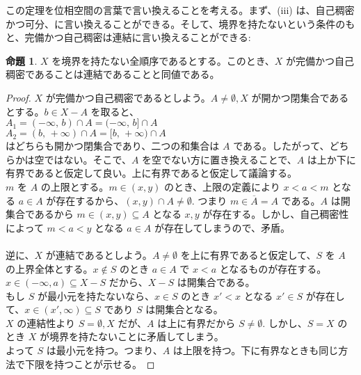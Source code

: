 \documentclass{jsarticle}
\theoremstyle{definition}
\newtheorem{proposition}[theorem]{命題}
\begin{document}
    \vspace{1.0ex}
    
    この定理を位相空間の言葉で言い換えることを考える。まず、(iii) は、自己稠密かつ可分、に言い換えることができる。そして、境界を持たないという条件のもと、完備かつ自己稠密は連結に言い換えることができる:
    
    \vspace{1.0ex}
    
    \begin{proposition}
        $X$ を境界を持たない全順序であるとする。このとき、$X$ が完備かつ自己稠密であることは連結であることと同値である。
    \end{proposition}
    \begin{proof}
        $X$ が完備かつ自己稠密であるとしよう。$A \neq \emptyset, X$ が開かつ閉集合であるとする。$b \in X - A$ を取ると、\\
        $A_1 = (-\infty, \, b) \cap A = (-\infty, \, b] \cap A$\\
        $A_2 = (b, \, +\infty) \cap A = [b, \, +\infty) \cap A$\\
        はどちらも開かつ閉集合であり、二つの和集合は $A$ である。したがって、どちらかは空ではない。そこで、$A$ を空でない方に置き換えることで、$A$ は上か下に有界であると仮定して良い。上に有界であると仮定して議論する。\\
        $m$ を $A$ の上限とする。$m \in (x, y)$ のとき、上限の定義により $x < a < m$ となる $a \in A$ が存在するから、$(x, y) \cap A \neq \emptyset.$ つまり $m \in \overline{A} = A$ である。$A$ は開集合であるから $m \in (x, y) \subseteq A$ となる $x, y$ が存在する。しかし、自己稠密性によって $m < a < y$ となる $a \in A$ が存在してしまうので、矛盾。\\
        \ \\
        逆に、$X$ が連結であるとしよう。$A\neq\emptyset$ を上に有界であると仮定して、$S$ を $A$ の上界全体とする。$x \not\in S$ のとき $a \in A$ で $x < a$ となるものが存在する。$x \in (-\infty, a) \subseteq X-S$ だから、$X-S$ は開集合である。\\
        もし $S$ が最小元を持たないなら、$x \in S$ のとき $x' < x$ となる $x' \in S$ が存在して、$x \in (x', \infty) \subseteq S$ であり $S$ は開集合となる。\\
        $X$ の連結性より $S = \emptyset, X$ だが、$A$ は上に有界だから $S \neq \emptyset.$ しかし、$S = X$ のとき $X$ が境界を持たないことに矛盾してしまう。\\
        よって $S$ は最小元を持つ。つまり、$A$ は上限を持つ。下に有界なときも同じ方法で下限を持つことが示せる。
    \end{proof}
    
\end{document}
